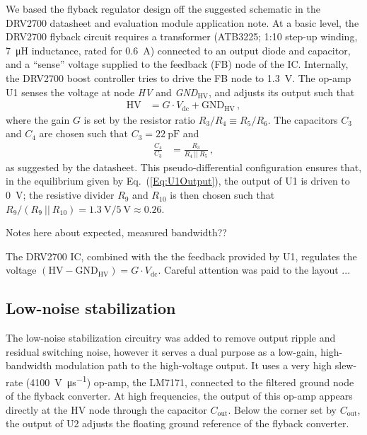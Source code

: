 \documentclass[aip,rsi,reprint]{revtex4-1} %
\begin{document}
We based the flyback regulator design off the suggested schematic in the DRV2700 datasheet and evaluation module application note.
At a basic level, the DRV2700 flyback circuit requires a transformer (ATB3225; 1:10 step-up winding, \SI{7}{\micro\henry} inductance, rated for \SI{0.6}{\ampere}) connected to an output diode and capacitor, and a ``sense'' voltage supplied to the feedback (FB) node of the IC.
Internally, the DRV2700 boost controller tries to drive the FB node to \SI{1.3}{\volt}.
The op-amp U1 senses the voltage at node \textit{HV} and \textit{GND}${}_\text{HV}$, and adjusts its output such that
\begin{align}
\label{Eq:U1Output}
\text{HV} &= G\cdot V_{\text{dc}} + \text{GND}_{\text{HV}}\,,
\end{align}
where the gain $G$ is set by the resistor ratio $R_3/R_4 \equiv R_5/R_6$.
The capacitors $C_3$ and $C_4$ are chosen such that $C_3 = \SI{22}{\pico\farad}$ and 
\begin{align}
\frac{C_4}{C_3} &= \frac{R_3}{R_4~||~R_5}\,,
\end{align}
as suggested by the datasheet.
This pseudo-differential configuration ensures that, in the equilibrium given by Eq.~(\ref{Eq:U1Output}), the output of U1 is driven to \SI{0}{\volt}; the resistive divider $R_9$ and $R_{10}$ is then chosen such that $R_9/(R_9~||~R_{10}) = \SI{1.3}{\volt}/\SI{5}{\volt} \approx \num{0.26}$.



Notes here about expected, measured bandwidth??

The DRV2700 IC, combined with the the feedback provided by U1, regulates the voltage $(\text{HV}-\text{GND}_{\text{HV}}) = G\cdot V_{\text{dc}}$.
Careful attention was paid to the layout ...

\subsection{Low-noise stabilization}
\label{Sec:LowNoiseStabilization}

The low-noise stabilization circuitry was added to remove output ripple and residual switching noise, however it serves a dual purpose as a low-gain, high-bandwidth modulation path to the high-voltage output.
It uses a very high slew-rate (\SI{4100}{\volt\per\micro\second}) op-amp, the LM7171, connected to the filtered ground node of the flyback converter.
At high frequencies, the output of this op-amp appears directly at the HV node through the capacitor $C_{\text{out}}$.
Below the corner set by $C_{\text{out}}$, the output of U2 adjusts the floating ground reference of the flyback converter.
\end{document}
